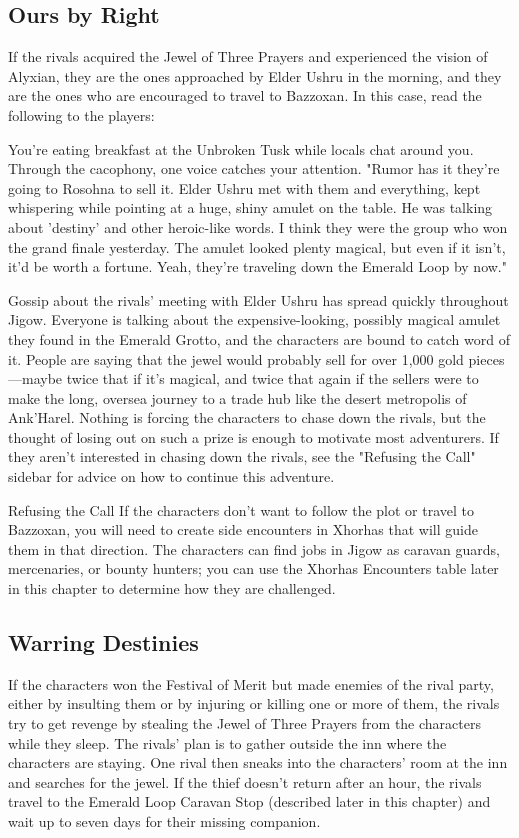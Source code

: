 \documentclass[10pt,a4,twoside,twocolumn,openany,nodeprecatedcode]{dndbook}
\begin{document}
\subsection{Ours by Right}
If the rivals acquired the Jewel of Three Prayers and experienced the vision of Alyxian, they are the ones approached by Elder Ushru in the morning, and they are the ones who are encouraged to travel to Bazzoxan. In this case, read the following to the players:
\begin{DndReadAloud}{}
You're eating breakfast at the Unbroken Tusk while locals chat around you. Through the cacophony, one voice catches your attention.
"Rumor has it they're going to Rosohna to sell it. Elder Ushru met with them and everything, kept whispering while pointing at a huge, shiny amulet on the table. He was talking about 'destiny' and other heroic-like words. I think they were the group who won the grand finale yesterday. The amulet looked plenty magical, but even if it isn't, it'd be worth a fortune. Yeah, they're traveling down the Emerald Loop by now."
\end{DndReadAloud}

Gossip about the rivals' meeting with Elder Ushru has spread quickly throughout Jigow. Everyone is talking about the expensive-looking, possibly magical amulet they found in the Emerald Grotto, and the characters are bound to catch word of it. People are saying that the jewel would probably sell for over 1,000 gold pieces—maybe twice that if it's magical, and twice that again if the sellers were to make the long, oversea journey to a trade hub like the desert metropolis of Ank'Harel.
Nothing is forcing the characters to chase down the rivals, but the thought of losing out on such a prize is enough to motivate most adventurers. If they aren't interested in chasing down the rivals, see the "Refusing the Call" sidebar for advice on how to continue this adventure.
\begin{DndComment}{Refusing the Call}
If the characters don't want to follow the plot or travel to Bazzoxan, you will need to create side encounters in Xhorhas that will guide them in that direction. The characters can find jobs in Jigow as caravan guards, mercenaries, or bounty hunters; you can use the Xhorhas Encounters table later in this chapter to determine how they are challenged.
\end{DndComment}

\subsection{Warring Destinies}
If the characters won the Festival of Merit but made enemies of the rival party, either by insulting them or by injuring or killing one or more of them, the rivals try to get revenge by stealing the Jewel of Three Prayers from the characters while they sleep.
The rivals' plan is to gather outside the inn where the characters are staying. One rival then sneaks into the characters' room at the inn and searches for the jewel. If the thief doesn't return after an hour, the rivals travel to the Emerald Loop Caravan Stop (described later in this chapter) and wait up to seven days for their missing companion.
\end{document}
